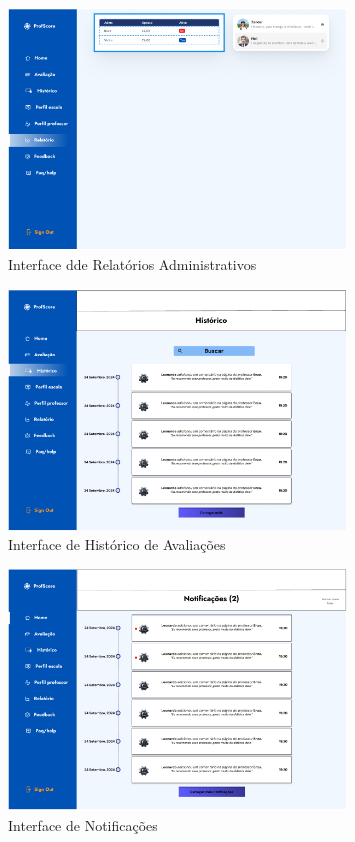 \documentclass[12pt]{article}
\begin{document}
\begin{figure}[H] %
  \centering
  \includegraphics[width=0.8\textwidth]{interfaces/i6-relatorio.png}
  \caption{Interface dde Relatórios Administrativos}
  \label{fig:i6-relatorio}
\end{figure}

\begin{figure}[H] %
  \centering
  \includegraphics[width=0.8\textwidth]{interfaces/i7-historico.png}
  \caption{Interface de Histórico de Avaliações}
  \label{fig:i7-historico}
\end{figure}

\begin{figure}[H] %
  \centering
  \includegraphics[width=0.8\textwidth]{interfaces/i8-notificacoes.png}
  \caption{Interface de Notificações}
  \label{fig:i8-notificacoes}
\end{figure}
\end{document}
